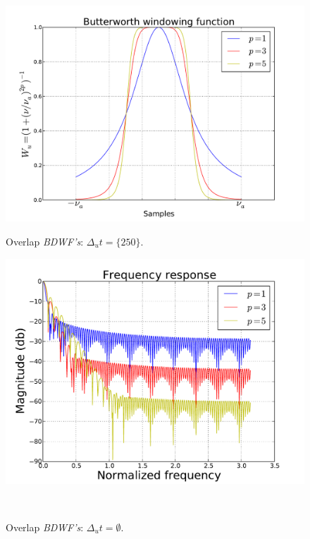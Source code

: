 \documentclass[useAMS,usenatbib]{mn2e}
\begin{document}
\begin{figure}
\begin{minipage}{0.36\linewidth}\includegraphics[width=1\textwidth]{./Figures/Butterwordth.pdf}\caption{Overlap 
		\textit{BDWF's}: $\Delta_u t=\{250\}$.}\label{fig:fig_butter}\end{minipage}
\begin{minipage}{0.36\linewidth}\includegraphics[width=1\textwidth]{./Figures/freq_resp_butterwordh.pdf}\caption{Overlap 
		\textit{BDWF's}: $\Delta_u t=\emptyset$.}\label{fig:fig_butter_freq}\end{minipage}\\

\end{figure}
\end{document}
